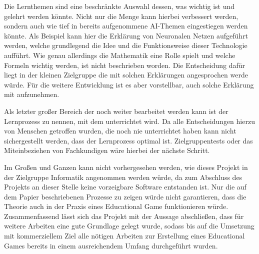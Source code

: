 Die Lernthemen sind eine beschränkte Auswahl dessen, was wichtig ist und gelehrt werden könnte. Nicht nur die Menge kann hierbei verbessert werden, sondern auch wie tief in bereits aufgenommene AI-Themen eingestiegen werden könnte. Als Beispiel kann hier die Erklärung von Neuronalen Netzen aufgeführt werden, welche grundlegend die Idee und die Funktionsweise dieser Technologie aufführt. Wie genau allerdings die Mathematik eine Rolle spielt und welche Formeln wichtig werden, ist nicht beschrieben worden. Die Entscheidung dafür liegt in der kleinen Zielgruppe die mit solchen Erklärungen angesprochen werde würde. Für die weitere Entwicklung ist es aber vorstellbar, auch solche Erklärung mit aufzunehmen.

Als letzter großer Bereich der noch weiter bearbeitet werden kann ist der Lernprozess zu nennen, mit dem unterrichtet wird. Da alle Entscheidungen hierzu von Menschen getroffen wurden, die noch nie unterrichtet haben kann nicht sichergestellt werden, dass der Lernprozess optimal ist. Zielgruppentests oder das Miteinbeziehen von Fachkundigen wäre hierbei der nächste Schritt.

Im Großen und Ganzen kann nicht vorhergesehen werden, wie dieses Projekt in der Zielgruppe Informatik angenommen werden würde, da zum Abschluss des Projekts an dieser Stelle keine vorzeigbare Software entstanden ist. Nur die auf dem Papier beschriebenen Prozesse zu zeigen würde nicht garantieren, dass die Theorie auch in der Praxis eines Educational Game funktionieren würde. Zusammenfassend lässt sich das Projekt mit der Aussage abschließen, dass für weitere Arbeiten eine gute Grundlage gelegt wurde, sodass bis auf die Umsetzung mit kommerziellem Ziel alle nötigen Arbeiten zur Erstellung eines Educational Games bereits in einem ausreichendem Umfang durchgeführt wurden.